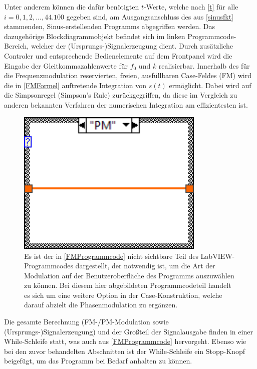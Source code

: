 \documentclass[
a4paper,
12pt,
pagesize,
ngerman
]{scrartcl}
\begin{document}
	\noindent Unter anderem können die dafür benötigten $t$-Werte, welche nach \cref{t} für alle $i = 0,1,2,...,44.100$ gegeben sind, am Ausgangsanschluss des aus \cref{sinusfkt} stammenden, Sinus-erstellenden Programms abgegriffen werden. 
	Das dazugehörige Blockdiagrammobjekt befindet sich im linken Programmcode-Bereich, welcher der (Ursprungs-)Signalerzeugung dient. 
	Durch zusätzliche Controler und entsprechende Bedienelemente auf dem Frontpanel wird die Eingabe der Gleitkommazahlenwerte für $f_0$ und $k$ realisierbar. 
	Innerhalb des für die Frequenzmodulation reservierten, freien, ausfüllbaren Case-Feldes (\glqq FM\grqq) wird die in \cref{FMFormel} auftretende Integration von $s(t)$ ermöglicht. 
	Dabei wird auf die Simpsonregel (\glqq Simpson's Rule\grqq ) zurückgegriffen, da diese im Vergleich zu anderen bekannten Verfahren der numerischen Integration am effizientesten ist. 
	
	\begin{figure}[H]
		\centering
		\includegraphics[width=0.8\textwidth]{EIRE2018Dateien/Tag4/FMPM-Erzeugung/PM-FMPM-Erzeugungd1} %
		\caption{Es ist der in \cref{FMProgrammcode} nicht sichtbare Teil des LabVIEW-Programmcodes dargestellt, der notwendig ist, um die Art der Modulation auf der Benutzeroberfläche des Programms auszuwählen zu können. Bei diesem hier abgebildeten Programmcodeteil handelt es sich um eine weitere Option in der Case-Konstruktion, welche darauf abzielt die Phasenmodulation zu ergänzen.}
		\label{PMProgrammcode}
	\end{figure}
	
	\noindent Die gesamte Berechnung (FM-/PM-Modulation sowie (Ursprungs-)Signalerzeugung) und der Großteil der Signalausgabe finden in einer While-Schleife statt, was auch aus \cref{FMProgrammcode} hervorgeht. 
	Ebenso wie bei den zuvor behandelten Abschnitten ist der While-Schleife ein \glqq Stopp\grqq -Knopf beigefügt, um das Programm bei Bedarf anhalten zu können.
\end{document}
